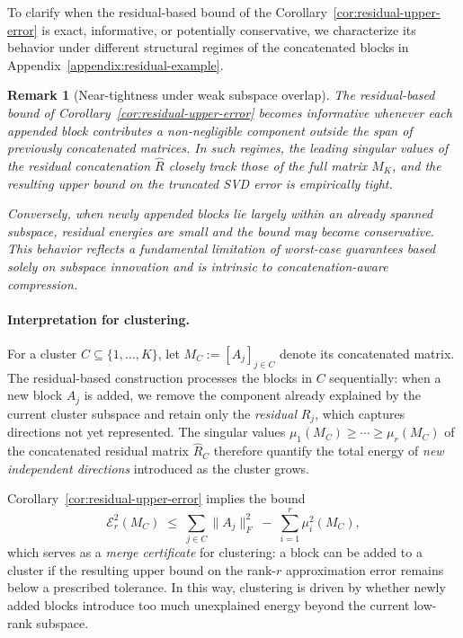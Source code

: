 \documentclass[10pt]{article} %
\newtheorem{remark}{Remark}
\begin{document}
To clarify when the residual-based bound of the Corollary~\ref{cor:residual-upper-error} is exact, informative, or potentially conservative, we characterize its behavior under different structural regimes of the
concatenated blocks in Appendix~\ref{appendix:residual-example}.

\begin{remark}[Near-tightness under weak subspace overlap]
The residual-based bound of Corollary~\ref{cor:residual-upper-error} becomes informative whenever each appended block contributes
a non-negligible component outside the span of previously concatenated matrices. In such regimes,
the leading singular values of the residual concatenation $\widehat{R}$ closely track those of the full
matrix $M_K$, and the resulting upper bound on the truncated SVD error is empirically tight.

Conversely, when newly appended blocks lie largely within an already spanned subspace, residual
energies are small and the bound may become conservative. This behavior reflects a fundamental
limitation of worst-case guarantees based solely on subspace innovation and is intrinsic to
concatenation-aware compression.
\end{remark}


\paragraph{Interpretation for clustering.}
For a cluster $C \subseteq \{1,\dots,K\}$, let $M_C := [A_j]_{j\in C}$ denote
its concatenated matrix. The residual-based construction processes the blocks
in $C$ sequentially: when a new block $A_j$ is added, we remove the component
already explained by the current cluster subspace and retain only the
\emph{residual} $R_j$, which captures directions not yet represented. The
singular values $\mu_1(M_C)\ge\cdots\ge\mu_r(M_C)$ of the concatenated residual
matrix $\widehat{R}_C$ therefore quantify the total energy of \emph{new
independent directions} introduced as the cluster grows.

Corollary~\ref{cor:residual-upper-error} implies the bound
\[
  \mathcal{E}_r^2(M_C)
  \;\le\;
  \sum_{j\in C} \|A_j\|_F^2 \;-\; \sum_{i=1}^r \mu_i^2(M_C),
\]
which serves as a \emph{merge certificate} for clustering: a block can be added
to a cluster if the resulting upper bound on the rank-$r$ approximation error
remains below a prescribed tolerance. In this way, clustering is driven by
whether newly added blocks introduce too much unexplained energy beyond the
current low-rank subspace.
\end{document}
